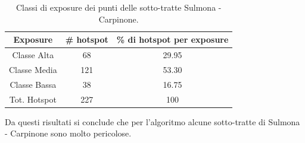 \begin{table}[H]
	\centering
	\begin{tabular}{|c|c|c|}
		\hline
		\rowcolor[HTML]{C0C0C0} 
		\textbf{Exposure} & \textbf{\# hotspot} & \textbf{\% di hotspot per exposure} \\ \hline
		Classe Alta       & 68                  & 29.95                                   \\ \hline
		Classe Media      & 121                 & 53.30                         \\ \hline
		Classe Bassa      & 38              & 16.75                             \\ \hline
		Tot. Hotspot      & 227               & 100                                 \\ \hline
	\end{tabular}
	\caption{Classi di exposure dei punti delle sotto-tratte Sulmona - Carpinone.}
	\label{risultati_sulmona_carpinone}
\end{table}

Da questi risultati si conclude che per l'algoritmo alcune sotto-tratte di Sulmona - Carpinone sono molto pericolose. 

